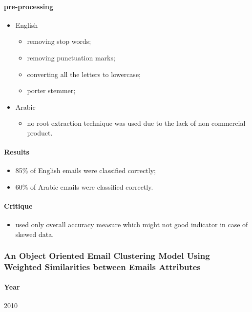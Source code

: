 \documentclass[12pt]{article}
\begin{document}
\paragraph{pre-processing}
\begin{itemize}
    \item English
    \begin{itemize}
        \item removing stop words;
        \item removing punctuation marks;
        \item converting all the letters to lowercase;
        \item porter stemmer;
    \end{itemize}
    \item Arabic
    \begin{itemize}
        \item no root extraction technique was used due to the lack of non commercial product.
    \end{itemize}
\end{itemize}

\paragraph{Results}
\begin{itemize}
    \item 85\% of English emails were classified correctly;
    \item 60\% of Arabic emails were classified correctly.
\end{itemize}

\paragraph{Critique}
\begin{itemize}
    \item used only overall accuracy measure which might not good indicator in case of skewed data.
\end{itemize}


\subsubsection{An Object Oriented Email Clustering Model Using Weighted 
	      Similarities between Emails Attributes \cite{NARESH10}}
\paragraph{Year} 2010
\end{document}
